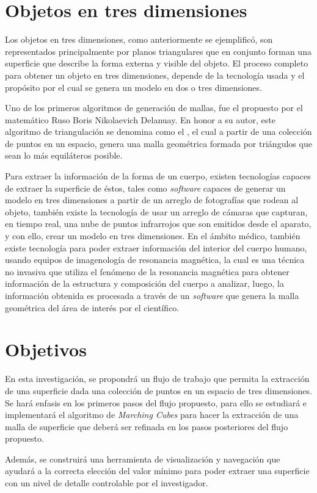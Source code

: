 \section{Objetos en tres dimensiones}
\label{sec:objectosEnTresDimensiones}
Los objetos en tres dimensiones, como anteriormente se ejemplificó, son representados
principalmente por planos triangulares que en conjunto forman una superficie que describe la
forma externa y visible del objeto. El proceso completo para obtener un objeto en tres dimensiones, depende de la tecnología usada y el propósito por el cual se genera un modelo en
dos o tres dimensiones.

Uno de los primeros algoritmos de generación de mallas, fue el propuesto por el
matemático Ruso Boris Nikolaevich Delanuay\cite{Delaunay1934}. En honor a su autor, este algoritmo de
triangulación se denomina como el , el cual a partir de
una colección de puntos en un espacio, genera una malla geométrica formada por triángulos que
sean lo más equiláteros posible.

Para extraer la información de la forma de un cuerpo, existen tecnologías capaces de
extraer la superficie de éstos, tales como \emph{software} capaces de generar un modelo en tres
dimensiones a partir de un arreglo de fotografías que rodean al objeto, también existe la
tecnología de usar un arreglo de cámaras que capturan, en tiempo real, una nube de puntos
infrarrojos que son emitidos desde el aparato, y con ello, crear un modelo en tres dimensiones. En
el ámbito médico, también existe tecnología para poder extraer información del interior del
cuerpo humano, usando equipos de imagenología de resonancia magnética, la cual es una técnica
no invasiva que utiliza el fenómeno de la resonancia magnética para obtener información de la
estructura y composición del cuerpo a analizar, luego, la información obtenida es procesada a
través de un \emph{software} que genera la malla geométrica del área de interés por el científico.

\section{Objetivos}
\label{sec:objetivos}
En esta investigación, se propondrá un flujo de trabajo que permita la extracción de una superficie dada una colección de puntos en un espacio de tres dimensiones. Se hará enfasis en los primeros pasos del flujo propuesto, para ello se estudiará e implementará el algoritmo de \emph{Marching Cubes} para hacer la extracción de una malla de superficie que deberá ser refinada en los pasos posteriores del flujo propuesto.

Además, se construirá una herramienta de visualización y navegación que ayudará a la correcta elección del valor mínimo para poder extraer una superficie con un nivel de detalle controlable por el investigador.